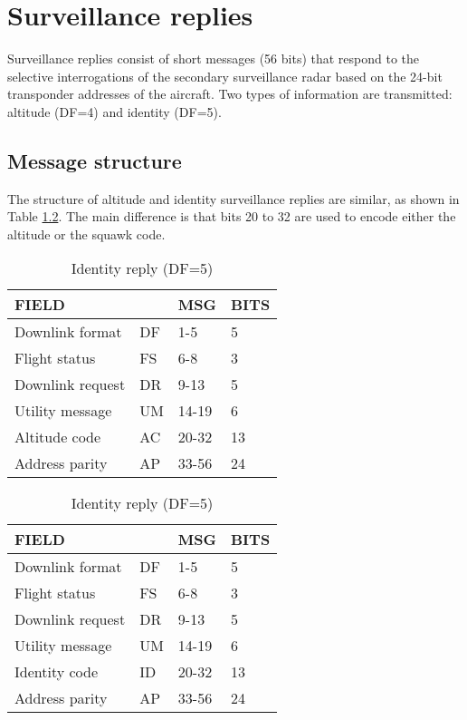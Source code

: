 \chapter{Surveillance replies} \label{chap:surv_reply}

Surveillance replies consist of short messages (56 bits) that respond to the selective interrogations of the secondary surveillance radar based on the 24-bit transponder addresses of the aircraft. Two types of information are transmitted: altitude (DF=4) and identity (DF=5).


\section{Message structure}

The structure of altitude and identity surveillance replies are similar, as shown in Table \ref{tb:df_4_5_structure}. The main difference is that bits 20 to 32 are used to encode either the altitude or the squawk code.

\begin{table}[ht]
\footnotesize
\caption{Surveillance replies}
\label{tb:df_4_5_structure}
\begin{subtable}[t]{.44\linewidth}
  \centering
  \caption{Altitude reply (DF=4)}
  \begin{tabular}[t]{|l|l|l|l|}
  \hline
  \textbf{FIELD} & \textbf{} & \textbf{MSG} & \textbf{BITS} \\ \hline
  Downlink format   & DF & 1-5    & 5   \\ \hline
  Flight status     & FS & 6-8    & 3   \\ \hline
  Downlink request  & DR & 9-13   & 5   \\ \hline
  Utility message   & UM & 14-19  & 6   \\ \hline
  Altitude code     & AC & 20-32  & 13  \\ \hline
  Address parity    & AP & 33-56  & 24  \\ \hline
  \end{tabular}
\end{subtable}%
\begin{subtable}[t]{.56\linewidth}
  \centering
  \caption{Identity reply (DF=5)}
  \begin{tabular}[t]{|l|l|l|l|}
  \hline
  \textbf{FIELD} & \textbf{} & \textbf{MSG} & \textbf{BITS} \\ \hline
  Downlink format   & DF & 1-5    & 5   \\ \hline
  Flight status     & FS & 6-8    & 3   \\ \hline
  Downlink request  & DR & 9-13   & 5   \\ \hline
  Utility message   & UM & 14-19  & 6   \\ \hline
  Identity code     & ID & 20-32  & 13  \\ \hline
  Address parity    & AP & 33-56  & 24  \\ \hline
  \end{tabular}
\end{subtable}
\end{table}

